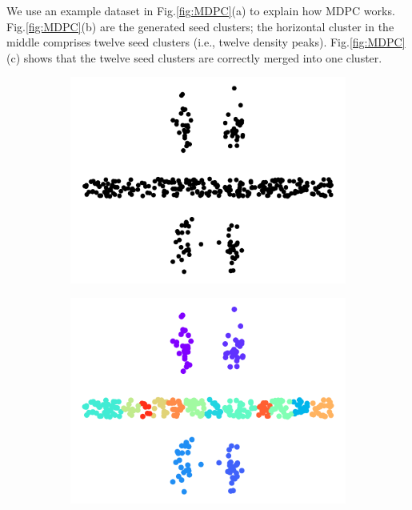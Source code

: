\documentclass{llncs}
\begin{document}
We use an example dataset \cite{dphmdataset} in Fig.\ref{fig:MDPC}(a) to explain how MDPC works. Fig.\ref{fig:MDPC}(b) are the generated seed clusters; the horizontal cluster in the middle comprises twelve seed clusters (i.e., twelve density peaks). Fig.\ref{fig:MDPC}(c) shows that the twelve seed clusters are correctly merged into one cluster.
%
\begin{figure}[ht]
\vspace*{-.4cm}
\centering
\begin{subfigure}[t]{0.28\textwidth}
\centering
\includegraphics[width=1\textwidth]{image/org.png}
\end{subfigure}
\quad
\begin{subfigure}[t]{0.28\textwidth}
\centering
\includegraphics[width=1\textwidth]{image/no_merge.png}

\end{subfigure}
\end{figure}
\end{document}
